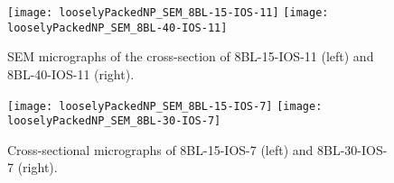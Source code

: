 \documentclass[\main/dresen_thesis.tex]{subfiles}
\begin{document}
  \label{sec:looselyPackedNS:bilayerStacks:sem}
  \begin{figure}[tb]
    \centering
    \texttt{[image: looselyPackedNP\_SEM\_8BL-15-IOS-11]}
    \texttt{[image: looselyPackedNP\_SEM\_8BL-40-IOS-11]}
    \caption{\label{fig:looselyPackedNP:bilayerStacks:sem11}SEM micrographs of the cross-section of 8BL-15-IOS-11 (left) and 8BL-40-IOS-11 (right).}
  \end{figure}
  \begin{figure}[tb]
    \centering
    \texttt{[image: looselyPackedNP\_SEM\_8BL-15-IOS-7]}
    \texttt{[image: looselyPackedNP\_SEM\_8BL-30-IOS-7]}
    \caption{\label{fig:looselyPackedNP:bilayerStacks:sem7}Cross-sectional micrographs of 8BL-15-IOS-7 (left) and 8BL-30-IOS-7 (right).}
  \end{figure}
\end{document}
